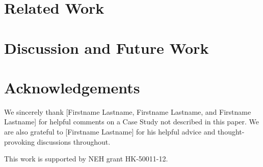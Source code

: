 \documentclass{sig-alternate}
\begin{document}
\section {Related Work}

\section{Discussion and Future Work}

\section{Acknowledgements}
We sincerely thank [Firstname Lastname, Firstname Lastname, and Firstname Lastname] for helpful comments on a Case Study not described in this paper. We are also grateful to [Firstname Lastname] for his helpful advice and thought-provoking discussions throughout.

This work is supported by NEH grant HK-50011-12.


 
  
\end{document}
